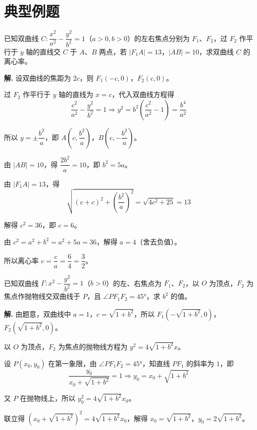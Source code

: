 \documentclass[11pt]{ctexrep}
\begin{document}
\section*{典型例题}

\begin{example}[双曲线的基本量计算]
    已知双曲线 $C: \dfrac{x^2}{a^2} - \dfrac{y^2}{b^2} = 1$（$a > 0, b > 0$）的左右焦点分别为 $F_1$、$F_2$，过 $F_2$ 作平行于 $y$ 轴的直线交 $C$ 于 $A$、$B$ 两点，若 $|F_1A| = 13$，$|AB| = 10$，求双曲线 $C$ 的离心率。
\end{example}

\textbf{解.} 设双曲线的焦距为 $2c$，则 $F_1(-c, 0)$，$F_2(c, 0)$。

过 $F_2$ 作平行于 $y$ 轴的直线为 $x = c$，代入双曲线方程得
\[
    \frac{c^2}{a^2} - \frac{y^2}{b^2} = 1 \Rightarrow y^2 = b^2\left(\frac{c^2}{a^2} - 1\right) = \frac{b^4}{a^2}
\]

所以 $y = \pm \dfrac{b^2}{a}$，即 $A\left(c, \dfrac{b^2}{a}\right)$，$B\left(c, -\dfrac{b^2}{a}\right)$。

由 $|AB| = 10$，得 $\dfrac{2b^2}{a} = 10$，即 $b^2 = 5a$。

由 $|F_1A| = 13$，得
\[
    \sqrt{(c + c)^2 + \left(\frac{b^2}{a}\right)^2} = \sqrt{4c^2 + 25} = 13
\]

解得 $c^2 = 36$，即 $c = 6$。

由 $c^2 = a^2 + b^2 = a^2 + 5a = 36$，解得 $a = 4$（舍去负值）。

所以离心率 $e = \dfrac{c}{a} = \dfrac{6}{4} = \dfrac{3}{2}$。

\begin{realexam}[2025届上海二模]
    已知双曲线 $\Gamma: x^2 - \dfrac{y^2}{b^2} = 1$（$b > 0$）的左、右焦点为 $F_1$、$F_2$，以 $O$ 为顶点，$F_2$ 为焦点作抛物线交双曲线于 $P$，且 $\angle PF_1F_2 = 45°$，求 $b^2$ 的值。
\end{realexam}

\textbf{解.} 由题意，双曲线中 $a = 1$，$c = \sqrt{1 + b^2}$，所以 $F_1(-\sqrt{1+b^2}, 0)$，$F_2(\sqrt{1+b^2}, 0)$。

以 $O$ 为顶点，$F_2$ 为焦点的抛物线方程为 $y^2 = 4\sqrt{1+b^2}x$。

设 $P(x_0, y_0)$ 在第一象限，由 $\angle PF_1F_2 = 45°$，知直线 $PF_1$ 的斜率为 $1$，即
\[
    \frac{y_0}{x_0 + \sqrt{1+b^2}} = 1 \Rightarrow y_0 = x_0 + \sqrt{1+b^2}
\]

又 $P$ 在抛物线上，所以 $y_0^2 = 4\sqrt{1+b^2}x_0$。

联立得 $(x_0 + \sqrt{1+b^2})^2 = 4\sqrt{1+b^2}x_0$，解得 $x_0 = \sqrt{1+b^2}$，$y_0 = 2\sqrt{1+b^2}$。
\end{document}
